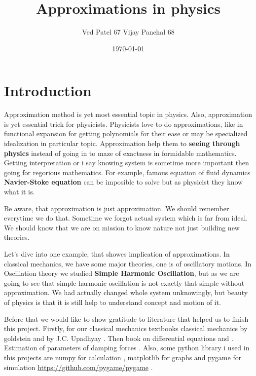 \documentclass{article}
\author{Ved Patel 67 Vijay Panchal 68}
\date{\today}
\title{Approximations in physics}
\begin{document}
\maketitle
\tableofcontents

\linespread{1.3}
\large




\pagebreak
\section{Introduction}
\label{sec:org7477d49}

Approximation method is yet most essential topic in physics. Also, approximation is yet essential trick for physicists. Physicists love to do approximations, like in functional expansion for getting polynomials for their ease or may be specialized idealization in particular topic. Approximation help them to \textbf{seeing through physics} instead of going in to maze of exactness in formidable  mathematics. Getting interpretation or i say knowing system is sometime more important then going for regorious mathematics. For example, famous equation of fluid dynamics \textbf{Navier-Stoke equation} can be imposible to solve but as physicist they know what it is.

Be aware, that approximation is just approximation. We should remember everytime we do that. Sometime we forgot actual system which is far from ideal. We should know that we are on mission to know nature not just building new theories.

Let's dive into one example, that showes implication of approximations. In classical mechanics, we have some major theories, one is of oscillatory motions. In Oscillation theory we studied \textbf{Simple Harmonic Oscillation}, but as we are going to see that simple harmonic oscillation is not exactly that simple without approximation. We had actually changed whole system unknowingly, but beauty of physics is that it is still help to understand concept and motion of it. 

Before that we would like to show gratitude to literature that helped us to finish this project. Firstly, for our classical mechanics textbooks classical mechanics by goldstein \cite{goldstein2002classical} and by J.C. Upadhyay \cite{upadhyay2016classical}. Then book on differential equations \cite{bronson2014schaum} and \cite{jordan2007nonlinear}. Estimation of parameters of damping forces \cite{salamon2020estimation}. Also, some python library i used in this projects are numpy for calculation \cite{harris2020array} , matplotlib \cite{Hunter2007}  for graphs and pygame for simulation \url{https://github.com/pygame/pygame} . 
\end{document}
